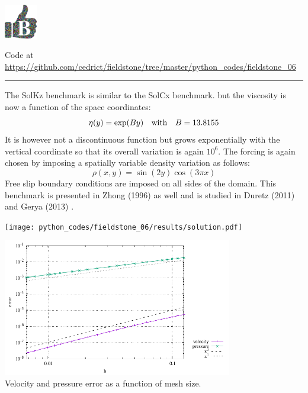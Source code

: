 
\includegraphics[height=1.5cm]{images/pictograms/benchmark}



\begin{center}
Code at \url{https://github.com/cedrict/fieldstone/tree/master/python_codes/fieldstone_06}
\end{center}

\par\noindent\rule{\textwidth}{0.4pt}

The SolKz benchmark \cite{repa87} is similar to the SolCx benchmark.
but the viscosity is now a function of the space coordinates: 
\begin{equation}
\eta(y)=\exp(By) \quad {\rm with} \quad B=13.8155
\end{equation}
It is however not a discontinuous function but grows exponentially with the vertical coordinate so that its overall variation is again $10^6$. 
The forcing is again chosen by imposing a spatially variable density variation as follows:
\begin{equation}
\rho(x,y)=\sin(2y) \cos(3\pi x)
\end{equation}
Free slip boundary conditions are imposed on all sides of the domain.
This benchmark is presented in Zhong (1996) \cite{zhon96} as well and is studied 
in Duretz \etal (2011) \cite{dumg11} and Gerya \etal (2013) \cite{gemd13}.

\begin{center}
\texttt{[image: python\_codes/fieldstone\_06/results/solution.pdf]}
\end{center}

\begin{center}
\includegraphics[width=10cm]{python_codes/fieldstone_06/results/errors.pdf}\\
{\captionfont Velocity and pressure error as a function of mesh size.}
\end{center}
